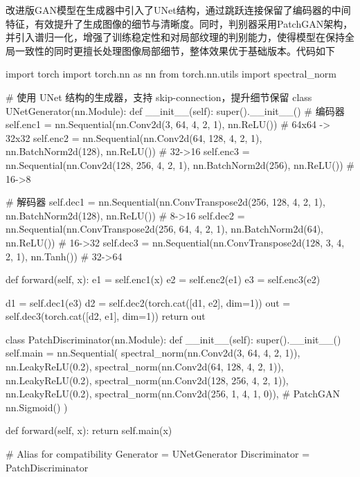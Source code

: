 \documentclass[12pt, a4paper, oneside]{ctexart}
\numberwithin{equation}{section}  %
\begin{document}
改进版GAN模型在生成器中引入了UNet结构，通过跳跃连接保留了编码器的中间特征，有效提升了生成图像的细节与清晰度。同时，判别器采用PatchGAN架构，并引入谱归一化，增强了训练稳定性和对局部纹理的判别能力，使得模型在保持全局一致性的同时更擅长处理图像局部细节，整体效果优于基础版本。代码如下
\begin{pythoncode}
import torch
import torch.nn as nn
from torch.nn.utils import spectral_norm

# 使用 UNet 结构的生成器，支持 skip-connection，提升细节保留
class UNetGenerator(nn.Module):
    def __init__(self):
        super().__init__()
        # 编码器
        self.enc1 = nn.Sequential(nn.Conv2d(3, 64, 4, 2, 1), nn.ReLU())         # 64x64 -> 32x32
        self.enc2 = nn.Sequential(nn.Conv2d(64, 128, 4, 2, 1), nn.BatchNorm2d(128), nn.ReLU())  # 32->16
        self.enc3 = nn.Sequential(nn.Conv2d(128, 256, 4, 2, 1), nn.BatchNorm2d(256), nn.ReLU()) # 16->8

        # 解码器
        self.dec1 = nn.Sequential(nn.ConvTranspose2d(256, 128, 4, 2, 1), nn.BatchNorm2d(128), nn.ReLU()) # 8->16
        self.dec2 = nn.Sequential(nn.ConvTranspose2d(256, 64, 4, 2, 1), nn.BatchNorm2d(64), nn.ReLU())   # 16->32
        self.dec3 = nn.Sequential(nn.ConvTranspose2d(128, 3, 4, 2, 1), nn.Tanh())                        # 32->64

    def forward(self, x):
        e1 = self.enc1(x)
        e2 = self.enc2(e1)
        e3 = self.enc3(e2)

        d1 = self.dec1(e3)
        d2 = self.dec2(torch.cat([d1, e2], dim=1))
        out = self.dec3(torch.cat([d2, e1], dim=1))
        return out

class PatchDiscriminator(nn.Module):
    def __init__(self):
        super().__init__()
        self.main = nn.Sequential(
            spectral_norm(nn.Conv2d(3, 64, 4, 2, 1)),
            nn.LeakyReLU(0.2),
            spectral_norm(nn.Conv2d(64, 128, 4, 2, 1)),
            nn.LeakyReLU(0.2),
            spectral_norm(nn.Conv2d(128, 256, 4, 2, 1)),
            nn.LeakyReLU(0.2),
            spectral_norm(nn.Conv2d(256, 1, 4, 1, 0)),  # PatchGAN
            nn.Sigmoid()
        )

    def forward(self, x):
        return self.main(x)

# Alias for compatibility
Generator = UNetGenerator
Discriminator = PatchDiscriminator
\end{pythoncode}
\end{document}
